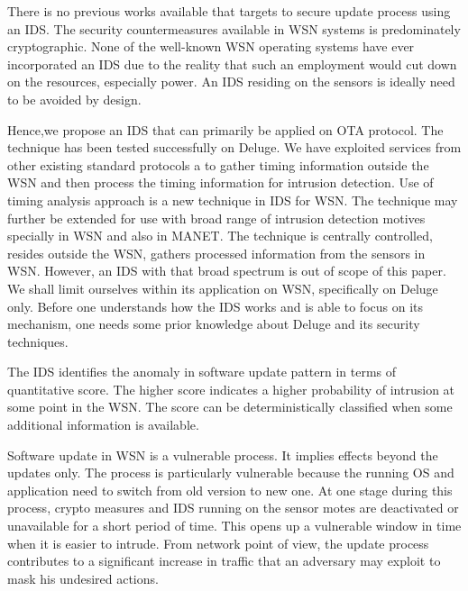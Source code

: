 \documentclass[conference,final]{IEEEtran}
\begin{document}
There is no previous works available that targets to secure update process using an IDS.
The security countermeasures available in WSN systems is predominately cryptographic.
None of the well-known WSN operating systems have ever incorporated an IDS due to the reality that such an employment would cut down on the resources, especially power.
An IDS residing on the sensors is ideally need to be avoided by design.

Hence,we propose an IDS that can primarily be applied on OTA protocol.
The technique has been tested successfully on Deluge.
We have exploited services from other existing standard protocols a to gather timing information outside the WSN and then process the timing information for intrusion detection.
Use of timing analysis approach is a new technique in IDS for WSN.
The technique may further be extended for use with broad range of intrusion detection motives specially in WSN and also in MANET.
The technique is centrally controlled, resides outside the WSN, gathers processed information from the sensors in WSN.
However, an IDS with that broad spectrum is out of scope of this paper.
We shall limit ourselves within its application on WSN, specifically on Deluge only.
Before one understands how the IDS works and is able to focus on its  mechanism, one needs some prior knowledge about Deluge and its security techniques.


The IDS identifies the anomaly in software update pattern in terms of quantitative score. The higher score indicates a higher probability of intrusion at some point in the WSN. The score can be deterministically classified when some additional information is available.


Software update in WSN is a vulnerable process.
It implies effects beyond the updates only.
The process is particularly vulnerable because the running OS and application need to switch from old version to new one. 
At one stage during this process, crypto measures and IDS running on the sensor motes are deactivated or unavailable for a short period of time.
This opens up a vulnerable window in time when it is easier to intrude.
From network point of view, the update process contributes to a significant increase in traffic that an adversary may exploit to  mask his undesired actions. 
\end{document}
